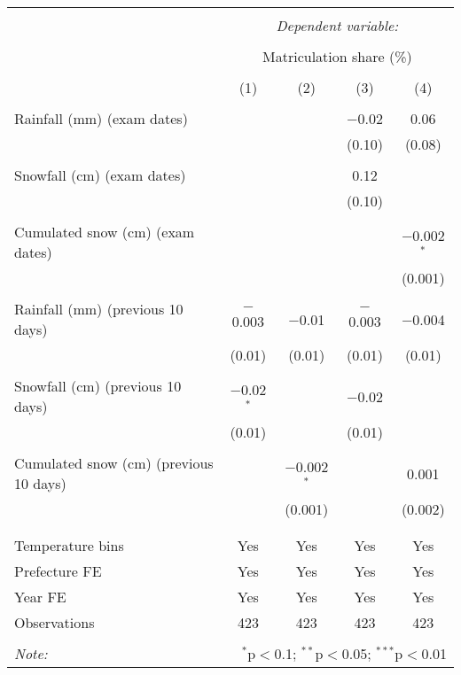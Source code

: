 
\begin{tabular}{@{\extracolsep{5pt}}lcccc} 
\\[-1.8ex]\hline 
\hline \\[-1.8ex] 
 & \multicolumn{4}{c}{\textit{Dependent variable:}} \\ 
\cline{2-5} 
\\[-1.8ex] & \multicolumn{4}{c}{Matriculation share (\%)} \\ 
\\[-1.8ex] & (1) & (2) & (3) & (4)\\ 
\hline \\[-1.8ex] 
 Rainfall (mm) (exam dates) &  &  & $-$0.02 & 0.06 \\ 
  &  &  & (0.10) & (0.08) \\ 
  & & & & \\ 
 Snowfall (cm) (exam dates) &  &  & 0.12 &  \\ 
  &  &  & (0.10) &  \\ 
  & & & & \\ 
 Cumulated snow (cm) (exam dates) &  &  &  & $-$0.002$^{*}$ \\ 
  &  &  &  & (0.001) \\ 
  & & & & \\ 
 Rainfall (mm) (previous 10 days) & $-$0.003 & $-$0.01 & $-$0.003 & $-$0.004 \\ 
  & (0.01) & (0.01) & (0.01) & (0.01) \\ 
  & & & & \\ 
 Snowfall (cm) (previous 10 days) & $-$0.02$^{*}$ &  & $-$0.02 &  \\ 
  & (0.01) &  & (0.01) &  \\ 
  & & & & \\ 
 Cumulated snow (cm) (previous 10 days) &  & $-$0.002$^{*}$ &  & 0.001 \\ 
  &  & (0.001) &  & (0.002) \\ 
  & & & & \\ 
\hline \\[-1.8ex] 
Temperature bins & Yes & Yes & Yes & Yes \\ 
Prefecture FE & Yes & Yes & Yes & Yes \\ 
Year FE & Yes & Yes & Yes & Yes \\ 
Observations & 423 & 423 & 423 & 423 \\ 
\hline 
\hline \\[-1.8ex] 
\textit{Note:}  & \multicolumn{4}{r}{$^{*}$p$<$0.1; $^{**}$p$<$0.05; $^{***}$p$<$0.01} \\ 
\end{tabular} 
